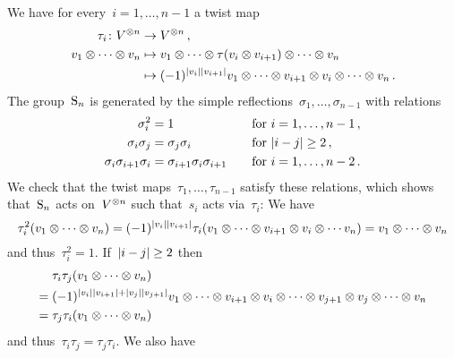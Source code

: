 We have for every~$i = 1, \dotsc, n-1$ a twist map
\begin{align*}
  \tau_i
  \colon
  V^{\otimes n}
  &\to
  V^{\otimes n} \,,
  \\
  v_1 \otimes \dotsb \otimes v_n
  &\mapsto
  v_1 \otimes \dotsb \otimes \tau(v_i \otimes v_{i+1}) \otimes \dotsb \otimes v_n
  \\
  &\mapsto
  (-1)^{\lvert v_i\rvert \lvert v_{i+1}\rvert}
  v_1 \otimes \dotsb \otimes v_{i+1} \otimes v_i \otimes \dotsb \otimes v_n \,.
\end{align*}
The group~$\operatorname{S}_n$ is generated by the simple reflections~$\sigma_1, \dotsc, \sigma_{n-1}$ with relations
\begin{alignat*}{2}
  \sigma_i^2
  &=
  1
  &
  \quad
  &\text{for~$i = 1, \dotsc, n-1$} \,,
  \\
  \sigma_i \sigma_j
  &=
  \sigma_j \sigma_i
  &
  \quad
  &\text{for~$\lvert i-j\rvert \geq 2$} \,,
  \\
  \sigma_i \sigma_{i+1} \sigma_i
  &=
  \sigma_{i+1} \sigma_i \sigma_{i+1}
  &
  \quad
  &\text{for~$i = 1, \dotsc, n-2$} \,.
\end{alignat*}
We check that the twist maps~$\tau_1, \dotsc, \tau_{n-1}$ satisfy these relations, which shows that~$\operatorname{S}_n$ acts on~$V^{\otimes n}$ such that~$s_i$ acts via~$\tau_i$:
We have
\[
  \tau_i^2(v_1 \otimes \dotsb \otimes v_n)
  =
  (-1)^{\lvert v_i\rvert \lvert v_{i+1}\rvert}
  \tau_i(v_1 \otimes \dotsb \otimes v_{i+1} \otimes v_i \otimes \dotsb v_n)
  =
  v_1 \otimes \dotsb \otimes v_n
\]
and thus~$\tau_i^2 = 1$.
If~$\lvert i-j\rvert \geq 2$ then
\begin{align*}
  {}&
  \tau_i \tau_j (v_1 \otimes \dotsb \otimes v_n)
  \\
  ={}&
  (-1)^{\lvert v_i\rvert \lvert v_{i+1}\rvert + \lvert v_j\rvert \lvert v_{j+1}\rvert}
          v_1
  \otimes \dotsb
  \otimes v_{i+1} \otimes v_i
  \otimes \dotsb
  \otimes v_{j+1} \otimes v_j
  \otimes \dotsb
  \otimes v_n
  \\
  ={}&
  \tau_j \tau_i (v_1 \otimes \dotsb \otimes v_n)
\end{align*}
and thus~$\tau_i \tau_j = \tau_j \tau_i$.
We also have
